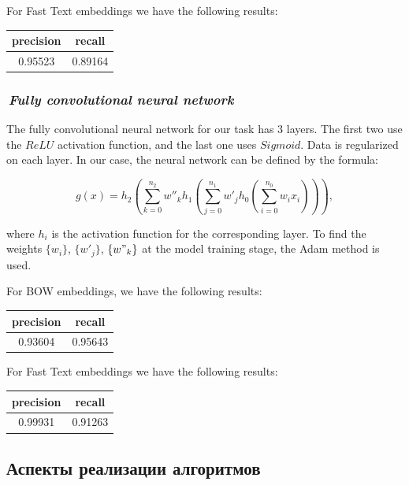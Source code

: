 \documentclass[12pt]{article}
\begin{document}
For Fast Text embeddings we have the following results:
\begin{center}
  \begin{tabular}{ | c | c |}
    \hline
     precision & recall \\ \hline
     0.95523 & 0.89164  \\ \hline
  \end{tabular}
\end{center}

\subsubsection*{\it\,Fully convolutional neural network}

The fully convolutional neural network for our task has 3 layers. The first two use the $ReLU$ activation function, and the last one uses $Sigmoid$. Data is regularized on each layer. In our case, the neural network can be defined by the formula:

$$
g(x) = h_2 \left(\sum_{k=0}^{n_2} w''_k h_1\left(\sum_{j=0}^{n_1} w'_j h_0\left( \sum_{i=0}^{n_0} w_i x_i \right)\right)\right),
$$

where $h_i$ is the activation function for the corresponding layer. To find the weights $\{w_i\}$, $\{w'_j\}$, $\{w"_k\}$ at the model training stage, the Adam method is used.

For BOW embeddings, we have the following results:
\begin{center}
  \begin{tabular}{ | c | c |}
    \hline
     precision & recall \\ \hline
     0.93604 & 0.95643 \\ \hline
  \end{tabular}
\end{center}

For Fast Text embeddings we have the following results:
\begin{center}
  \begin{tabular}{ | c | c |}
    \hline
     precision & recall \\ \hline
     0.99931 & 0.91263 \\ \hline
  \end{tabular}
\end{center}

\subsection{Аспекты реализации алгоритмов}
\end{document}
